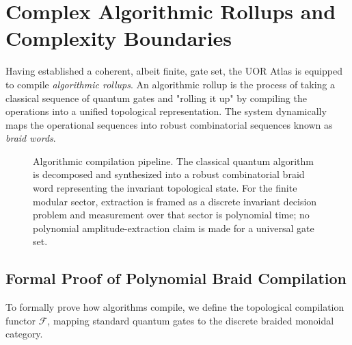 \section{Complex Algorithmic Rollups and Complexity Boundaries}

Having established a coherent, albeit finite, gate set, the UOR Atlas is equipped to compile \textit{algorithmic rollups}. An algorithmic rollup is the process of taking a classical sequence of quantum gates and "rolling it up" by compiling the operations into a unified topological representation. The system dynamically maps the operational sequences into robust combinatorial sequences known as \textit{braid words}. 

\begin{figure}[h]
\centering
{}
\caption{Algorithmic compilation pipeline. The classical quantum algorithm is decomposed and synthesized into a robust combinatorial braid word representing the invariant topological state. For the finite modular sector, extraction is framed as a discrete invariant decision problem and measurement over that sector is polynomial time; no polynomial amplitude-extraction claim is made for a universal gate set.}
\label{fig:compilation}
\end{figure}

\subsection{Formal Proof of Polynomial Braid Compilation}
To formally prove how algorithms compile, we define the topological compilation functor $\mathcal{F}$, mapping standard quantum gates to the discrete braided monoidal category.

